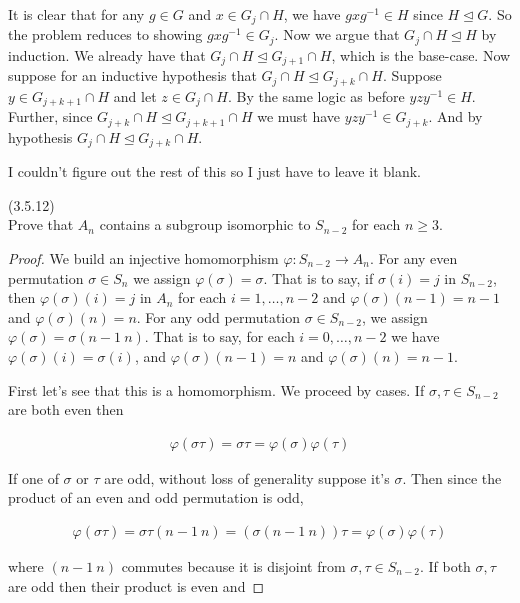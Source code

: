 \documentclass{exam}
\begin{document}
\begin{questions}
  It is clear that for any $g\in G$ and $x\in G_j\cap H$, we have $gxg^{-1}\in H$ since $H\trianglelefteq G$.  So the problem reduces to showing $gxg^{-1}\in G_j$.  Now we argue that $G_j\cap H \trianglelefteq H$ by induction.  We already have that $G_j\cap H\trianglelefteq G_{j+1}\cap H$, which is the base-case.  Now suppose for an inductive hypothesis that $G_j\cap H\trianglelefteq G_{j+k} \cap H$.  Suppose $y\in G_{j+k+1}\cap H$ and let $z\in G_{j}\cap H$.  By the same logic as before $yzy^{-1}\in H$.  Further, since $G_{j+k}\cap H \trianglelefteq G_{j+k+1}\cap H$ we must have $yzy^{-1}\in G_{j+k}$.  And by hypothesis $G_j\cap H\trianglelefteq G_{j+k}\cap H$.

  I couldn't figure out the rest of this so I just have to leave it blank.

\question(3.5.12)\\
Prove that $A_n$ contains a subgroup isomorphic to $S_{n-2}$ for each $n\geq 3$.

\begin{proof}
  We build an injective homomorphism $\varphi: S_{n-2}\rightarrow A_n$.  For any even permutation $\sigma\in S_n$ we assign $\varphi(\sigma)=\sigma$.  That is to say, if $\sigma(i)=j$ in $S_{n-2}$, then $\varphi(\sigma)(i)=j$ in $A_n$ for each $i=1,\dots,n-2$ and $\varphi(\sigma)(n-1)=n-1$ and $\varphi(\sigma)(n)=n$.  For any odd permutation $\sigma\in S_{n-2}$, we assign $\varphi(\sigma) = \sigma(n-1\ n)$.  That is to say, for each $i=0,\dots,n-2$ we have $\varphi(\sigma)(i) = \sigma(i)$, and $\varphi(\sigma)(n-1) = n$ and $\varphi(\sigma)(n)=n-1$.

  First let's see that this is a homomorphism.  We proceed by cases.  If $\sigma,\tau\in S_{n-2}$ are both even then

  \begin{align*}
    \varphi(\sigma\tau) = \sigma\tau = \varphi(\sigma)\varphi(\tau)
  \end{align*}

  If one of $\sigma$ or $\tau$ are odd, without loss of generality suppose it's $\sigma$.  Then since the product of an even and odd permutation is odd,

  \begin{align*}
    \varphi(\sigma\tau) = \sigma\tau(n-1\ n) = (\sigma(n-1\ n))\tau = \varphi(\sigma)\varphi(\tau)
  \end{align*}

  where $(n-1\ n)$ commutes because it is disjoint from $\sigma,\tau\in S_{n-2}$.  If both $\sigma,\tau$ are odd then their product is even and


\end{proof}
\end{questions}
\end{document}
